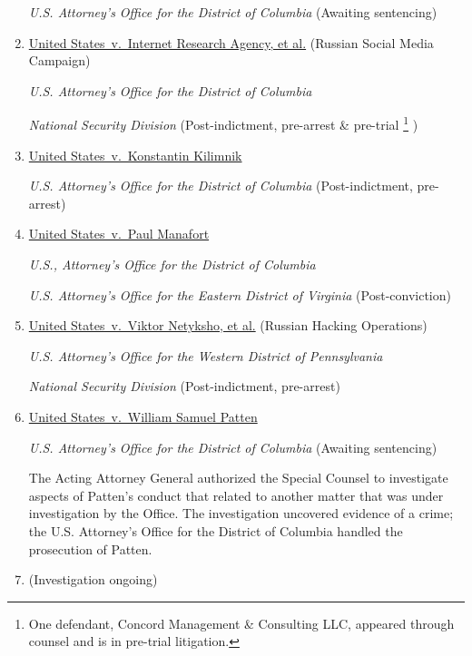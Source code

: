 \begin{enumerate}[1.]
\textit{U.S. Attorney's Office for the District of Columbia}\hfil\break
(Awaiting sentencing)

    \item \underline{United States~v.\ Internet Research Agency, et al.} (Russian Social Media Campaign)

\textit{U.S. Attorney's Office for the District of Columbia}

\textit{National Security Division}\hfil\break
(Post-indictment, pre-arrest \& pre-trial%
\footnote{One defendant, Concord Management \& Consulting LLC, appeared through counsel and is in pre-trial litigation.}
)

    \item \underline{United States~v.\ Konstantin Kilimnik}

\textit{U.S. Attorney's Office for the District of Columbia}\hfil\break
(Post-indictment, pre-arrest)

    \item \underline{United States~v.\ Paul Manafort}

\textit{U.S., Attorney's Office for the District of Columbia}

\textit{U.S. Attorney's Office for the Eastern District of Virginia}\hfil\break
(Post-conviction)

    \item \underline{United States~v.\ Viktor Netyksho, et al.} (Russian Hacking Operations)

\textit{U.S. Attorney's Office for the Western District of Pennsylvania}

\textit{National Security Division}\hfil\break
(Post-indictment, pre-arrest)

    \item \underline{United States~v.\ William Samuel Patten}

\textit{U.S. Attorney's Office for the District of Columbia}\hfil\break
(Awaiting sentencing)

The Acting Attorney General authorized the Special Counsel to investigate aspects of Patten's conduct that related to another matter that was under investigation by the Office.
The investigation uncovered evidence of a crime; the U.S. Attorney's Office for the District of Columbia handled the prosecution of Patten.

    \item \underline{}

\hfil\break
(Investigation ongoing)


\end{enumerate}
